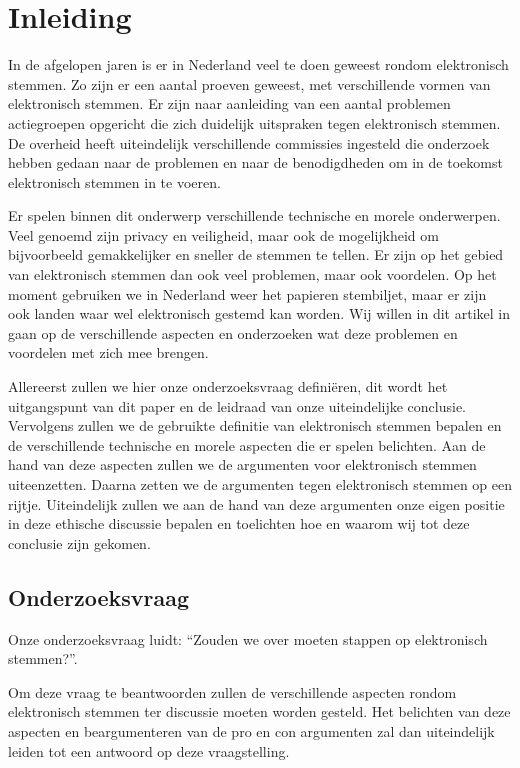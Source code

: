 \documentclass[a4paper]{article}
\begin{document}
\thispagestyle{plain}
\renewcommand{\contentsname}{Inhoud} 
\tableofcontents

\newpage

\section{Inleiding}

In de afgelopen jaren is er in Nederland veel te doen geweest rondom elektronisch stemmen.
Zo zijn er een aantal proeven geweest, met verschillende vormen van elektronisch stemmen.
Er zijn naar aanleiding van een aantal problemen actiegroepen opgericht die zich duidelijk uitspraken tegen elektronisch stemmen.
De overheid heeft uiteindelijk verschillende commissies ingesteld die onderzoek hebben gedaan naar de problemen en naar de benodigdheden om in de toekomst elektronisch stemmen in te voeren.

Er spelen binnen dit onderwerp verschillende technische en morele onderwerpen.
Veel genoemd zijn privacy en veiligheid, maar ook de mogelijkheid om bijvoorbeeld gemakkelijker en sneller de stemmen te tellen.
Er zijn op het gebied van elektronisch stemmen dan ook veel problemen, maar ook voordelen.
Op het moment gebruiken we in Nederland weer het papieren stembiljet, maar er zijn ook landen waar wel elektronisch gestemd kan worden.
Wij willen in dit artikel in gaan op de verschillende aspecten en onderzoeken wat deze problemen en voordelen met zich mee brengen.

Allereerst zullen we hier onze onderzoeksvraag definiëren, dit wordt het uitgangspunt van dit paper en de leidraad van onze uiteindelijke conclusie.
Vervolgens zullen we de gebruikte definitie van elektronisch stemmen bepalen en de verschillende technische en morele aspecten die er spelen belichten.
Aan de hand van deze aspecten zullen we de argumenten voor elektronisch stemmen uiteenzetten.
Daarna zetten we de argumenten tegen elektronisch stemmen op een rijtje.
Uiteindelijk zullen we aan de hand van deze argumenten onze eigen positie in deze ethische discussie bepalen en toelichten hoe en waarom wij tot deze conclusie zijn gekomen.

\subsection{Onderzoeksvraag}

Onze onderzoeksvraag luidt: ``Zouden we over moeten stappen op elektronisch stemmen?''.

Om deze vraag te beantwoorden zullen de verschillende aspecten rondom elektronisch stemmen ter discussie moeten worden gesteld.
Het belichten van deze aspecten en beargumenteren van de pro en con argumenten zal dan uiteindelijk leiden tot een antwoord op deze vraagstelling.
\end{document}
